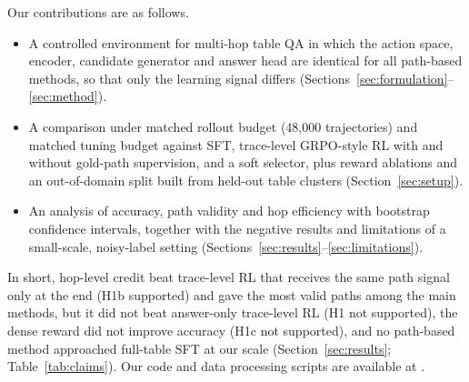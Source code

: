 Our contributions are as follows.
\begin{itemize}\setlength\itemsep{0pt}
  \item A controlled environment for multi-hop table QA in which the action space, encoder, candidate generator and answer head are identical for all path-based methods, so that only the learning signal differs (Sections~\ref{sec:formulation}--\ref{sec:method}).
  \item A comparison under matched rollout budget (48{,}000 trajectories) and matched tuning budget against SFT, trace-level GRPO-style RL with and without gold-path supervision, and a soft selector, plus reward ablations and an out-of-domain split built from held-out table clusters (Section~\ref{sec:setup}).
  \item An analysis of accuracy, path validity and hop efficiency with bootstrap confidence intervals, together with the negative results and limitations of a small-scale, noisy-label setting (Sections~\ref{sec:results}--\ref{sec:limitations}).
\end{itemize}
In short, hop-level credit beat trace-level RL that receives the same path signal only at the end (H1b supported) and gave the most valid paths among the main methods, but it did not beat answer-only trace-level RL (H1 not supported), the dense reward did not improve accuracy (H1c not supported), and no path-based method approached full-table SFT at our scale (Section~\ref{sec:results}; Table~\ref{tab:claims}).
Our code and data processing scripts are available at \codelink.
